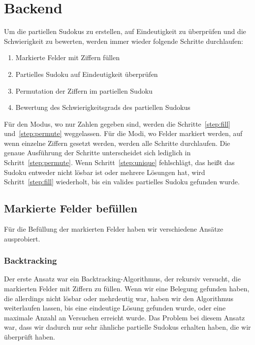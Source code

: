 \usepackage{algorithmicx}\section{Backend}

Um die partiellen Sudokus zu erstellen, auf Eindeutigkeit zu überprüfen und die Schwierigkeit zu bewerten,
werden immer wieder folgende Schritte durchlaufen:
\begin{enumerate}
    \item \label{step:fill} Markierte Felder mit Ziffern füllen
    \item \label{step:unique} Partielles Sudoku auf Eindeutigkeit überprüfen
    \item \label{step:permute} Permutation der Ziffern im partiellen Sudoku
    \item \label{step:difficulty} Bewertung des Schwierigkeitsgrads des partiellen Sudokus
\end{enumerate}
Für den Modus, wo nur Zahlen gegeben sind, werden die Schritte~\ref{step:fill} und~\ref{step:permute} weggelassen.
Für die Modi, wo Felder markiert werden, auf wenn einzelne Ziffern gesetzt werden, werden alle Schritte durchlaufen.
Die genaue Ausführung der Schritte unterscheidet sich lediglich in Schritt~\ref{step:permute}.
Wenn Schritt~\ref{step:unique} fehlschlägt, das heißt das Sudoku entweder nicht lösbar ist oder mehrere Lösungen hat,
wird Schritt~\ref{step:fill} wiederholt, bis ein valides partielles Sudoku gefunden wurde.

\subsection{Markierte Felder befüllen}
Für die Befüllung der markierten Felder haben wir verschiedene Ansätze ausprobiert.

\subsubsection{Backtracking}
Der erste Ansatz war ein Backtracking-Algorithmus, der rekursiv versucht, die markierten Felder mit Ziffern zu füllen.
Wenn wir eine Belegung gefunden haben, die allerdings nicht lösbar oder mehrdeutig war, haben wir den Algorithmus weiterlaufen lassen,
bis eine eindeutige Lösung gefunden wurde, oder eine maximale Anzahl an Versuchen erreicht wurde.
Das Problem bei diesem Ansatz war, dass wir dadurch nur sehr ähnliche partielle Sudokus erhalten haben,
die wir überprüft haben.

